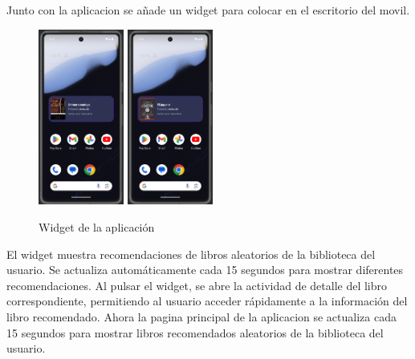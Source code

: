 \documentclass[a4paper,11pt]{report}
\begin{document}
      Junto con la aplicacion se añade un widget para colocar en el escritorio del movil.
      \begin{figure}[H]
        \centering
        \includegraphics[width=0.25\textwidth]{.img/widget.png}
        \hspace{2cm}
        \includegraphics[width=0.25\textwidth]{.img/widget_2.png}
        \caption{Widget de la aplicación}
        \label{fig:widget}
      \end{figure}
      El widget muestra recomendaciones de libros aleatorios de la biblioteca del usuario. Se actualiza automáticamente cada 15 segundos para mostrar diferentes recomendaciones.
      Al pulsar el widget, se abre la actividad de detalle del libro correspondiente, permitiendo al usuario acceder rápidamente a la información del libro recomendado.
      Ahora la pagina principal de la aplicacion se actualiza cada 15 segundos para mostrar libros recomendados aleatorios de la biblioteca del usuario.
\end{document}

